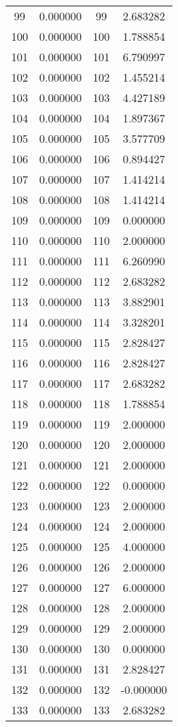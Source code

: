 \documentclass[12pt]{article}
\begin{document}
\begin{longtable}{@{}cccc@{}}
99 & 0.000000 & 99 & 2.683282 \\
100 & 0.000000 & 100 & 1.788854 \\
101 & 0.000000 & 101 & 6.790997 \\
102 & 0.000000 & 102 & 1.455214 \\
103 & 0.000000 & 103 & 4.427189 \\
104 & 0.000000 & 104 & 1.897367 \\
105 & 0.000000 & 105 & 3.577709 \\
106 & 0.000000 & 106 & 0.894427 \\
107 & 0.000000 & 107 & 1.414214 \\
108 & 0.000000 & 108 & 1.414214 \\
109 & 0.000000 & 109 & 0.000000 \\
110 & 0.000000 & 110 & 2.000000 \\
111 & 0.000000 & 111 & 6.260990 \\
112 & 0.000000 & 112 & 2.683282 \\
113 & 0.000000 & 113 & 3.882901 \\
114 & 0.000000 & 114 & 3.328201 \\
115 & 0.000000 & 115 & 2.828427 \\
116 & 0.000000 & 116 & 2.828427 \\
117 & 0.000000 & 117 & 2.683282 \\
118 & 0.000000 & 118 & 1.788854 \\
119 & 0.000000 & 119 & 2.000000 \\
120 & 0.000000 & 120 & 2.000000 \\
121 & 0.000000 & 121 & 2.000000 \\
122 & 0.000000 & 122 & 0.000000 \\
123 & 0.000000 & 123 & 2.000000 \\
124 & 0.000000 & 124 & 2.000000 \\
125 & 0.000000 & 125 & 4.000000 \\
126 & 0.000000 & 126 & 2.000000 \\
127 & 0.000000 & 127 & 6.000000 \\
128 & 0.000000 & 128 & 2.000000 \\
129 & 0.000000 & 129 & 2.000000 \\
130 & 0.000000 & 130 & 0.000000 \\
131 & 0.000000 & 131 & 2.828427 \\
132 & 0.000000 & 132 & -0.000000 \\
133 & 0.000000 & 133 & 2.683282 \\

\end{longtable}
\end{document}
